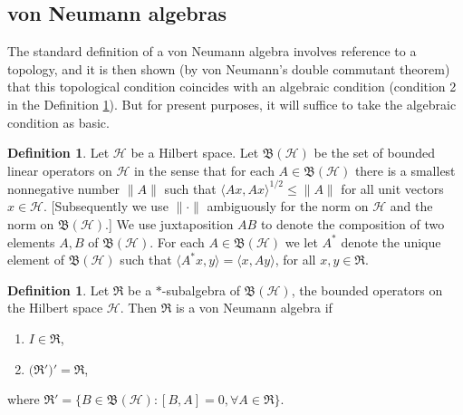 \documentclass[12pt]{article}
\newcommand{\alg}[1]{\mathfrak{#1}}
\newcommand{\norm}[1]{\| #1\|}
\newcommand{\bh}{\mathfrak{B}(\mathcal{H})}
\theoremstyle{definition}
\theoremstyle{definition}
\newtheorem{defn}[thm]{Definition}
\theoremstyle{remark}
\def\2#1{{\mathcal #1}}
\begin{document}
\subsection{von Neumann algebras}

The standard definition of a von Neumann algebra involves reference to a topology,
and it is then shown (by von Neumann's double commutant theorem) that this
topological condition coincides with an algebraic condition (condition 2 in the
Definition \ref{vNA}).  But for present purposes, it will suffice to take the
algebraic condition as basic.

\begin{defn} Let $\2H$ be a Hilbert space.  Let $\bh$ be the set of
  bounded linear operators on $\2H$ in the sense that for each $A\in
  \bh$ there is a smallest nonnegative number $\norm{A}$ such that
  $\langle Ax,Ax\rangle ^{1/2}\leq \norm{A}$ for all unit vectors
  $x\in \2H$.  [Subsequently we use $\norm{\cdot }$ ambiguously for
  the norm on $\2H$ and the norm on $\bh$.]  We use juxtaposition $AB$
  to denote the composition of two elements $A,B$ of $\bh$.  For each
  $A\in \bh$ we let $A^*$ denote the unique element of $\bh$ such that
  $\langle A^*x,y\rangle =\langle x,Ay\rangle$, for all $x,y\in
  \alg{R}$.  \end{defn}

\begin{defn} Let $\alg{R}$ be a $*$-subalgebra of $\bh$, the bounded operators on the
  Hilbert space $\2H$.  Then $\alg{R}$ is a von Neumann algebra if
  \begin{enumerate}
\item $I\in \alg{R}$, 
\item $\alg(\alg{R}')'=\alg{R}$,
\end{enumerate}
where $\alg{R}'=\{ B\in \bh :[B,A]=0 ,\forall A\in \alg{R} \} $. \label{vNA}
\end{defn}
\end{document}

